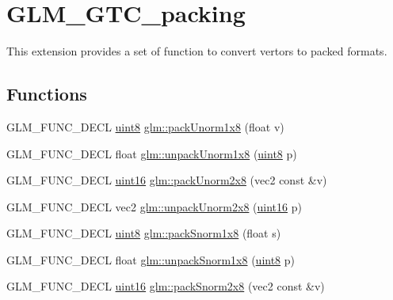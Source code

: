 \hypertarget{group__gtc__packing}{}\section{G\+L\+M\+\_\+\+G\+T\+C\+\_\+packing}
\label{group__gtc__packing}


This extension provides a set of function to convert vertors to packed formats.  


\subsection*{Functions}
\begin{DoxyCompactItemize}
\item 
G\+L\+M\+\_\+\+F\+U\+N\+C\+\_\+\+D\+E\+C\+L \hyperlink{stb__image_8c_adde6aaee8457bee49c2a92621fe22b79}{uint8} \hyperlink{group__gtc__packing_ga2f9963e5d762b10085b280d3662017ba}{glm\+::pack\+Unorm1x8} (float v)
\item 
G\+L\+M\+\_\+\+F\+U\+N\+C\+\_\+\+D\+E\+C\+L float \hyperlink{group__gtc__packing_ga32f3f2642df2ea87449d59fb614a8305}{glm\+::unpack\+Unorm1x8} (\hyperlink{stb__image_8c_adde6aaee8457bee49c2a92621fe22b79}{uint8} p)
\item 
G\+L\+M\+\_\+\+F\+U\+N\+C\+\_\+\+D\+E\+C\+L \hyperlink{stb__image_8c_a05f6b0ae8f6a6e135b0e290c25fe0e4e}{uint16} \hyperlink{group__gtc__packing_ga833288fc0d4a79f19d0db75a6843bfe6}{glm\+::pack\+Unorm2x8} (vec2 const \&v)
\item 
G\+L\+M\+\_\+\+F\+U\+N\+C\+\_\+\+D\+E\+C\+L vec2 \hyperlink{group__gtc__packing_ga96ce0c24339ee676e28a027fffd1edf6}{glm\+::unpack\+Unorm2x8} (\hyperlink{stb__image_8c_a05f6b0ae8f6a6e135b0e290c25fe0e4e}{uint16} p)
\item 
G\+L\+M\+\_\+\+F\+U\+N\+C\+\_\+\+D\+E\+C\+L \hyperlink{stb__image_8c_adde6aaee8457bee49c2a92621fe22b79}{uint8} \hyperlink{group__gtc__packing_ga26b6cd7a35c46c4b6a342f3b97b47423}{glm\+::pack\+Snorm1x8} (float s)
\item 
G\+L\+M\+\_\+\+F\+U\+N\+C\+\_\+\+D\+E\+C\+L float \hyperlink{group__gtc__packing_ga6f2bebf536fbf7c8b97d4b306bb3354e}{glm\+::unpack\+Snorm1x8} (\hyperlink{stb__image_8c_adde6aaee8457bee49c2a92621fe22b79}{uint8} p)
\item 
G\+L\+M\+\_\+\+F\+U\+N\+C\+\_\+\+D\+E\+C\+L \hyperlink{stb__image_8c_a05f6b0ae8f6a6e135b0e290c25fe0e4e}{uint16} \hyperlink{group__gtc__packing_ga05d08a82923166ec7cd5d0e6154c9953}{glm\+::pack\+Snorm2x8} (vec2 const \&v)
\item 

\end{DoxyCompactItemize}
